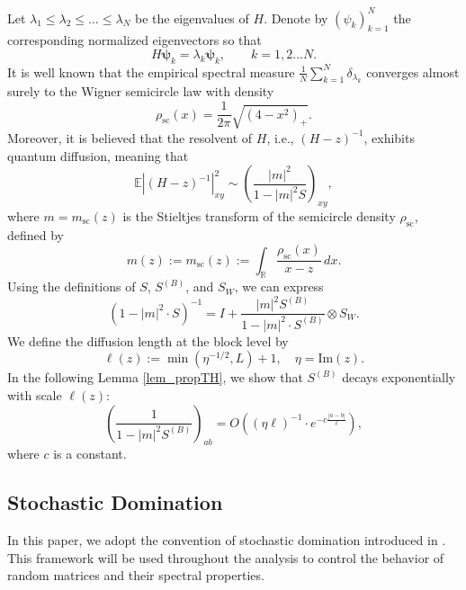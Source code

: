 \documentclass[10pt,reqno]{article}
\newcommand{\be}{\begin{equation}}
\newcommand{\ee}{\end{equation}}
\theoremstyle{plain} %
\theoremstyle{remark}
\numberwithin{equation}{section}
\begin{document}
Let \( \lambda_1 \leq \lambda_2 \leq \dots \leq \lambda_N \) be the eigenvalues of \( H \).  Denote by  \( \left( \psi_k \right)_{k=1}^N \)  the corresponding normalized eigenvectors  so that
\[
H \boldsymbol{\psi}_k = \lambda_k \boldsymbol{\psi}_k,\quad\quad  k=1,2\ldots N. 
\]
It is well known that the empirical spectral measure
$\frac{1}{N} \sum_{k=1}^N \delta_{\lambda_k}$
converges almost surely to the Wigner semicircle law with density
\[
\rho_{\mathrm{sc}}(x) = \frac{1}{2\pi} \sqrt{(4 - x^2)_+}.
\]
Moreover, it is believed that the resolvent of \( H \), i.e., \( (H - z)^{-1} \), exhibits quantum diffusion, meaning that
\[
\mathbb{E} \left| (H - z)^{-1} \right|_{xy}^2 \sim \left( \frac{|m|^2}{1 - |m|^2 S} \right)_{xy},
\]
where \( m = m_{\mathrm{sc}}(z) \) is the Stieltjes transform of the semicircle density \( \rho_{\mathrm{sc}} \), defined by
\[
m(z):=m_{\mathrm{sc}}(z) := \int_{\mathbb{R}} \frac{\rho_{\mathrm{sc}}(x)}{x - z} \, dx.
\]
Using the definitions of \( S \), \( S^{(B)} \), and \( S_W \), we can express 
\[
(1 - |m|^2 \cdot S)^{-1} = I + \frac{|m|^2 S^{(B)}}{1 - |m|^2 \cdot S^{(B)}} \otimes S_W.
\]
We define the diffusion length at the block level by
\be\label{def_ellz}
 \ell(z) := \min \left( \eta^{-1/2}, L \right) + 1, \quad \eta = \mathrm{Im}(z).
\ee
In the following Lemma \ref{lem_propTH}, we show that \( S^{(B)} \) decays exponentially with scale \( \ell(z) \):
\[
\left( \frac{1}{1 - |m|^2 S^{(B)}} \right)_{ab} = O \left( (\eta \ell)^{-1} \cdot e^{-c \frac{|a - b|}{\ell}} \right),
\]
where \( c \) is a constant.

\subsection*{Stochastic Domination}

In this paper, we adopt the convention of stochastic domination introduced in \cite{Average_fluc}. This framework will be used throughout the analysis to control the behavior of random matrices and their spectral properties.

 
\end{document}
